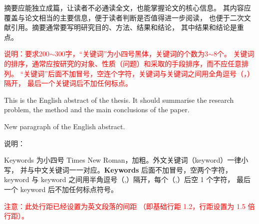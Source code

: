 \begin{cnabstract}
摘要应能独立成篇，让读者不必通读全文，也能掌握论文的核心信息。
其内容应覆盖与论文相当的主要信息，便于读者判断是否值得进一步阅读，
也便于二次文献引用。摘要通常要写明研究目的、方法、结果和结论，
其中结果和结论是重点。

\textcolor{red}{
说明：要求200$\sim$300字，“关键词”为小四号黑体，关键词的个数为3$\sim$8个。
关键词的排序，通常应按研究的对象、性质（问题）和采取的手段排序，而不应任意排列。
“关键词”后面不加冒号，空连个字符，关键词与关键词之间用全角逗号（，）隔开，
最后一个关键词后不加任何标点。
}

\end{cnabstract}

\begin{enabstract}
This is the English abstract of the thesis. It should summarise the research
problem, the method and the main conclusions of the paper.
\par
New paragraph of the English abstract.

\vspace{2em}
说明：\par 
Keywords 为小四号 Times New Roman，加粗。外文关键词（keyword）一律小写，
并与中文关键词一一对应。\textbf{Keywords} 后面不加冒号，空两个字符，
keyword 与 keyword 之间用半角逗号（,）隔开，每个（,）后空 1 个字符，
最后一个 keyword 后不加任何标点符号。
\par
\textcolor{red}{注意：此处行距已经设置为英文段落的间距
（即基础行距 1.2，行距设置为 1.5 倍行距）。}
\end{enabstract}
